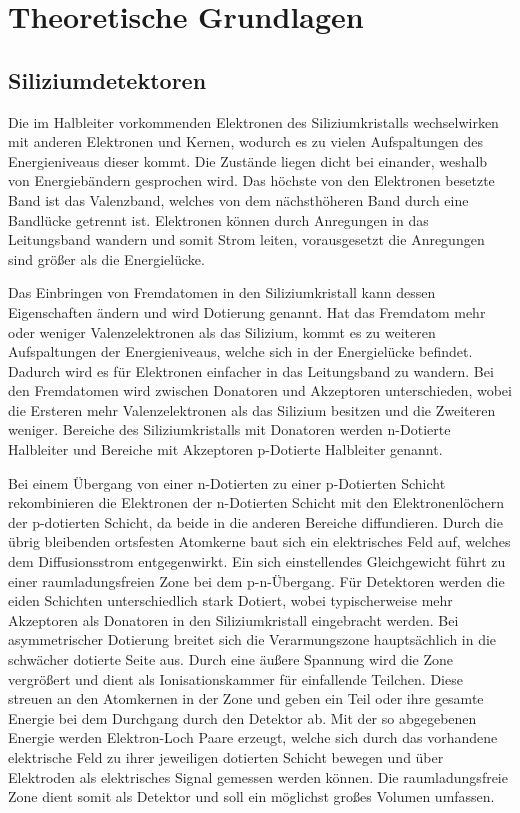 \chapter{Theoretische Grundlagen}


\section{Siliziumdetektoren}

Die im Halbleiter vorkommenden Elektronen des Siliziumkristalls wechselwirken mit anderen Elektronen und
Kernen, wodurch es zu vielen Aufspaltungen des Energieniveaus dieser kommt. Die
Zustände liegen dicht bei einander, weshalb von Energiebändern gesprochen wird.
Das höchste von den Elektronen besetzte Band ist das Valenzband, welches von dem
nächsthöheren Band durch eine Bandlücke getrennt ist. Elektronen können
durch Anregungen in das Leitungsband wandern und somit Strom leiten, vorausgesetzt
die Anregungen sind größer als die Energielücke.

Das Einbringen von Fremdatomen in den Siliziumkristall kann dessen Eigenschaften ändern
und wird Dotierung genannt.
Hat das Fremdatom mehr oder weniger Valenzelektronen als das Silizium, kommt
es zu weiteren Aufspaltungen der Energieniveaus, welche sich in der Energielücke
befindet. Dadurch wird es für Elektronen einfacher in das Leitungsband zu wandern.
Bei den Fremdatomen wird zwischen Donatoren und Akzeptoren unterschieden, wobei die
Ersteren mehr Valenzelektronen als das Silizium besitzen und die Zweiteren weniger.
Bereiche des Siliziumkristalls mit Donatoren werden n-Dotierte Halbleiter
und Bereiche mit Akzeptoren p-Dotierte Halbleiter genannt.

Bei einem Übergang von einer n-Dotierten zu einer p-Dotierten Schicht rekombinieren
die Elektronen der n-Dotierten Schicht mit den Elektronenlöchern der p-dotierten Schicht, da beide
in die anderen Bereiche diffundieren. Durch die übrig bleibenden ortsfesten Atomkerne
baut sich ein elektrisches Feld auf, welches dem Diffusionsstrom entgegenwirkt.
Ein sich einstellendes Gleichgewicht führt zu einer raumladungsfreien Zone bei
dem p-n-Übergang.
Für Detektoren werden die eiden Schichten unterschiedlich stark Dotiert, wobei typischerweise
mehr Akzeptoren als Donatoren in den Siliziumkristall eingebracht werden. Bei
asymmetrischer Dotierung breitet sich die Verarmungszone hauptsächlich in die schwächer dotierte Seite aus. 
Durch eine äußere Spannung wird die Zone vergrößert und dient als Ionisationskammer für einfallende Teilchen. Diese streuen
an den Atomkernen in der Zone und geben ein Teil oder ihre gesamte Energie bei dem Durchgang durch den Detektor ab. Mit der so abgegebenen
Energie werden Elektron-Loch Paare erzeugt, welche sich durch das vorhandene elektrische Feld zu ihrer jeweiligen dotierten
Schicht bewegen und über Elektroden als elektrisches Signal gemessen werden können.
Die raumladungsfreie Zone dient somit als Detektor und soll ein möglichst großes Volumen umfassen.

